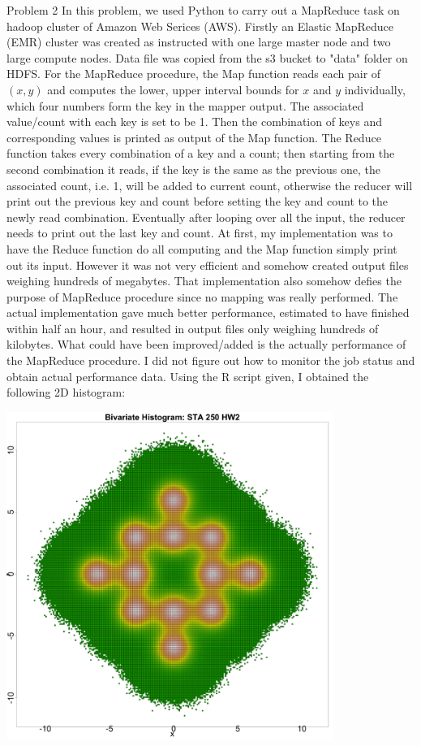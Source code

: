 \documentclass[12pt]{article}
\begin{document}
Problem 2 \newline \newline
In this problem, we used Python to carry out a MapReduce task on hadoop cluster of Amazon Web Serices (AWS). Firstly an Elastic MapReduce (EMR) cluster was created as instructed with one large master node and two large compute nodes. Data file was copied from the s3 bucket to "data" folder on HDFS. \newline
For the MapReduce procedure, the Map function reads each pair of $(x, y)$ and computes the lower, upper interval bounds for $x$ and $y$ individually, which four numbers form the key in the mapper output. The associated value/count with each key is set to be 1. Then the combination of keys and corresponding values is printed as output of the Map function. The Reduce function takes every combination of a key and a count; then starting from the second combination it reads, if the key is the same as the previous one, the associated count, i.e. 1, will be added to current count, otherwise the reducer will print out the previous key and count before setting the key and count to the newly read combination. Eventually after looping over all the input, the reducer needs to print out the last key and count. \newline
At first, my implementation was to have the Reduce function do all computing and the Map function simply print out its input. However it was not very efficient and somehow created output files weighing hundreds of megabytes. That implementation also somehow defies the purpose of MapReduce procedure since no mapping was really performed. The actual implementation gave much better performance, estimated to have finished within half an hour, and resulted in output files only weighing hundreds of kilobytes. What could have been improved/added is the actually performance of the MapReduce procedure. I did not figure out how to monitor the job status and obtain actual performance data. Using the R script given, I obtained the following 2D histogram:
\begin{center}
\includegraphics[width=0.8\textwidth]{hist2d.png}
\end{center}
\end{document}
